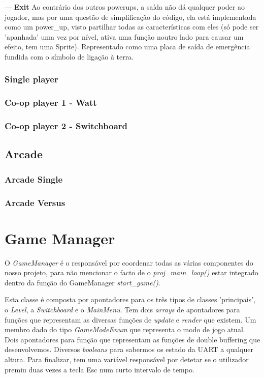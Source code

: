 \documentclass{report}
\begin{document}
--- \textbf{Exit} Ao contrário dos outros powerups, a saída não dá qualquer poder ao jogador, mas por uma questão de simplificação do código, ela está implementada como um power\_up, visto partilhar todas as características com eles (só pode ser 'apanhada' uma vez por nível, ativa uma função noutro lado para causar um efeito, tem uma Sprite). Representado como uma placa de saída de emergência fundida com o símbolo de ligação à terra.

\subsubsection{Single player}

\subsubsection{Co-op player 1 - Watt}

\subsubsection{Co-op player 2 - Switchboard}

\subsection{Arcade}

\subsubsection{Arcade Single}

\subsubsection{Arcade Versus}

\section{Game Manager}

O \textit{GameManager} é o responsável por coordenar todas as várias componentes do nosso projeto, para não mencionar o facto de o \textit{proj\_main\_loop()} estar integrado dentro da função do GameManager \textit{start\_game()}.

Esta classe é composta por apontadores para os três tipos de classes 'principais', o \textit{Level}, a \textit{Switchboard} e o \textit{MainMenu}. Tem dois \textit{arrays} de apontadores para funções que representam as diversas funções de \textit{update} e \textit{render} que existem. Um membro dado do tipo \textit{GameModeEnum} que representa o modo de jogo atual. Dois apontadores para função que representam as funções de double buffering que desenvolvemos. Diversos \textit{booleans} para sabermos os estado da UART a qualquer altura. Para finalizar, tem uma variável responsável por detetar se o utilizador premiu duas vezes a tecla Esc num curto intervalo de tempo.
\end{document}
